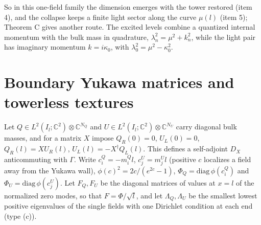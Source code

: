 \documentclass[aps,prd,reprint,onecolumn,nofootinbib,amsmath,amssymb,floatfix]{revtex4-2}
\theoremstyle{plain}
\newcommand{\C}{\mathbb C}
\begin{document}
So in this one-field family the dimension emerges with the tower restored (item 4), and the collapse keeps a finite light sector along the curve $\mu(l)$ (item 5); Theorem C gives another route. The excited levels combine a quantized internal momentum with the bulk mass in quadrature, $\lambda_n^2=\mu^2+k_n^2$, while the light pair has imaginary momentum $k=i\kappa_0$, with $\lambda_0^2=\mu^2-\kappa_0^2$.

\section{Boundary Yukawa matrices and towerless textures}

Let $Q\in L^2(I_l;\C^2)\otimes\C^{N_Q}$ and $U\in L^2(I_l;\C^2)\otimes\C^{N_U}$ carry diagonal bulk masses, and for a matrix $X$ impose $Q_R(0)=0$, $U_L(0)=0$, $Q_R(l)=XU_R(l)$, $U_L(l)=-X^\dagger Q_L(l)$. This defines a self-adjoint $D_X$ anticommuting with $\Gamma$. Write $c^Q_i=-m^Q_il$, $c^U_j=m^U_jl$ (positive $c$ localizes a field away from the Yukawa wall), $\phi(c)^2=2c/(e^{2c}-1)$, $\Phi_Q=\mathrm{diag}\,\phi(c^Q_i)$ and $\Phi_U=\mathrm{diag}\,\phi(c^U_j)$. Let $F_Q,F_U$ be the diagonal matrices of values at $x=l$ of the normalized zero modes, so that $F=\Phi/\sqrt l$, and let $\Lambda_Q,\Lambda_U$ be the smallest lowest positive eigenvalues of the single fields with one Dirichlet condition at each end (type (c)).
\end{document}
